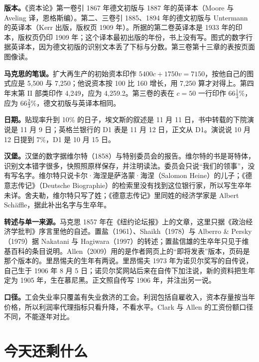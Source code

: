 \begin{deeper}[史料说明]
\textbf{版本。}《资本论》第一卷引 1867 年德文初版与 1887 年的英译本（Moore 与 Aveling 译，恩格斯编）。第二、三卷引 1885、1894 年的德文初版与 Untermann 的英译本（Kerr 出版，版权页 1909 年）。所据的第二卷英译本是 1933 年的印本，版权页仍印 1909 年；这个译本最初出版的年份，书上没有写。图式的数字行据英译本，因为德文初版的识别文本丢了下标与分数。第三卷第十三章的表按页面图像读。

\textbf{马克思的笔误。}扩大再生产的初始资本印作 $5400c+1750v=7150$，按他自己的图式应是 5,500 与 7,250；他说资本按 100 比 160 增长，用 7,250 算才对得上\cite{marx1909k2}。第四年末第 II 部类印作 4,249，应为 4,259.2。第三卷的表在 $c=50$ 一行印作 $66\tfrac{1}{3}\%$，应为 $66\tfrac{2}{3}\%$，德文初版与英译本相同\cite{marx1894,marx1909k3}。

\textbf{日期。}贴现率升到 10\% 的日子，埃文斯的叙述是 11 月 11 日，书中转载的下院演说是 11 月 9 日；英格兰银行的 D1 表是 11 月 12 日，正文从 D1\cite{evans1859,boe2017}。演说说 10 月 12 日提到 7\%，D1 是 10 月 15 日。

\textbf{汉堡。}汉堡的数字据维尔特（1858）与特别委员会的报告。维尔特的书是哥特体，识别文本错字很多，快照照原样保存，并注明读法。委员会只说“我们的领事”，没有写名字。维尔特只说卡尔·海涅是萨洛蒙·海涅（Salomon Heine）的儿子；《德意志传记》（Deutsche Biographie）的检索里没有找到这位银行家，所以写生卒年未详。舍夫勒，维尔特只写了姓；《德意志传记》里同姓的经济学家是 Albert Schäffle，据此补出名字与生卒年。

\textbf{转述与单一来源。}马克思 1857 年在《纽约论坛报》上的文章，这里只据《政治经济学批判》序言里他的自述。置盐（1961）、Shaikh（1978）与 Alberro \& Persky（1979）据 Nakatani 与 Hagiwara（1997）的转述；置盐信雄的生卒年只见于维基百科的条目说明。Allen（2009）用的是作者网页上的“即将发表”版本，页码是那个版本的。里昂惕夫的生年有两说。里昂惕夫 1973 年为诺贝尔奖写的自传说，自己生于 1906 年 8 月 5 日；诺贝尔奖网站后来在自传下加注说，新的资料把生年定为 1905 年，生在慕尼黑\cite{nobel1973}。正文照自传写 1906 年，并注出另一说。

\textbf{口径。}工会失业率只覆盖有失业救济的工会。利润包括自雇收入，资本存量按当年价格，所以利润率代理指标只看升降，不看水平。Clark 与 Allen 的工资份额口径不同，不能逐年对比。
\end{deeper}

\section{今天还剩什么}\label{sec:marx-legacy}

